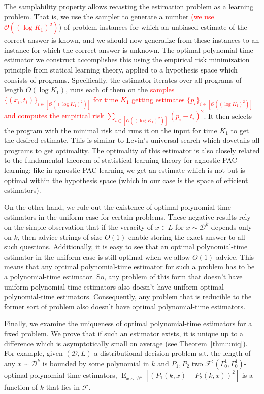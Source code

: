 \documentclass[11pt]{article}
\numberwithin{equation}{section}
\theoremstyle{definition}
\theoremstyle{plain}
\DeclareMathOperator{\E}{E}
\newcommand{\Dist}{\mathcal{D}}
\newcommand{\Fall}{\mathcal{F}}
\begin{document}
The samplability property allows recasting the estimation problem as a learning problem. That is, we use the sampler to generate a number \textcolor{red}{(we use ${\mathcal{O}\left(\left(\log{K_1}\right)^2\right)}$}) of problem instances for which an unbiased estimate of the correct answer is known, and we should now generalize from these instances to an instance for which the correct answer is unknown. The optimal polynomial-time estimator we construct accomplishes this using the empirical risk minimization principle from statical learning theory, applied to a hypothesis space which consists of programs. Specifically, the estimator iterates over all programs of length ${O\left(\log{K_1}\right)}$, runs each of them on the \textcolor{red}{samples ${\{(x_i,t_i)\}_{i \in [\mathcal{O}\left(\left(\log{K_1}\right)^2\right)]}}$ for time ${K_1}$ getting estimates ${\{p_i\}_{i \in [\mathcal{O}\left(\left(\log{K_1}\right)^2\right)]}}$ and computes the empirical risk ${\sum_{i \in [\mathcal{O}\left(\left(\log{K_1}\right)^2\right)]}(p_i-t_i)^2}$}. It then selects the program with the minimal risk and runs it on the input for time ${K_1}$ to get the desired estimate. This is similar to Levin's universal search which dovetails all programs to get optimality. The optimality of this estimator is also closely related to the fundamental theorem of statistical learning theory for agnostic PAC learning\cite{Shalev-Shwartz_2014}: like in agnostic PAC learning we get an estimate which is not  but is optimal within the hypothesis space (which in our case is the space of efficient estimators).

On the other hand, we rule out the existence of optimal polynomial-time estimators in the uniform case for certain problems. These negative results rely on the simple observation that if the veracity of ${x \in L}$ for ${x \sim \Dist^k}$ depends only on ${k}$, then advice strings of size $O(1)$ enable storing the exact answer to all such questions. Additionally, it is easy to see that an optimal polynomial-time estimator in the uniform case is still optimal when we allow ${O(1)}$ advice. This means that any optimal polynomial-time estimator for such a problem has to be a  polynomial-time estimator. So, any problem of this form that doesn't have uniform  polynomial-time estimators also doesn't have uniform optimal polynomial-time estimators. Consequently, any problem that is reducible to the former sort of problem also doesn't have optimal polynomial-time estimators.

Finally, we examine the uniqueness of optimal polynomial-time estimators for a fixed problem. We prove that if such an estimator exists, it is unique up to a difference which is asymptotically small on average (see Theorem~\ref{thm:uniq}). For example, given ${(\Dist,L)}$ a distributional decision problem s.t. the length of any ${x \sim \Dist^k}$ is bounded by some polynomial in ${k}$ and ${P_1,P_2}$ two ${\Fall^\sharp(\Gamma_0^1,\Gamma_0^1)}$-optimal polynomial time estimators, ${\E_{x \sim \Dist^k}[(P_1(k,x)-P_2(k,x))^2]}$ is a function of ${k}$ that lies in ${\Fall}$.
\end{document}
